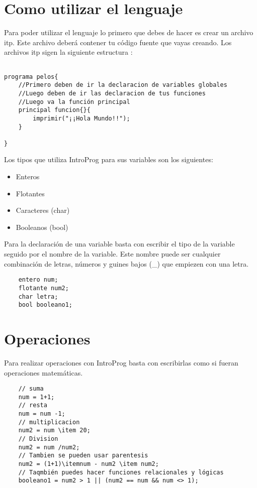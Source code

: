 \documentclass[
10pt, %
a4paper, %
oneside, %
headinclude,footinclude, %
BCOR5mm, %
]{scrartcl}
\begin{document}
\section{Como utilizar el lenguaje}

Para poder utilizar el lenguaje lo primero que debes de hacer es crear un archivo itp. Este archivo deberá contener tu código fuente que vayas creando.
Los archivos itp sigen la siguiente estructura :
\begin{lstlisting}

programa pelos{
    //Primero deben de ir la declaracion de variables globales
    //Luego deben de ir las declaracion de tus funciones
    //Luego va la función principal
    principal funcion{}{
        imprimir("¡¡Hola Mundo!!");
    }

}

\end{lstlisting}

Los tipos que utiliza IntroProg para sus variables son los siguientes:
\begin{itemize}
    \item Enteros
    \item Flotantes
    \item Caracteres (char)
    \item Booleanos (bool)
\end{itemize}

Para la declaración de una variable basta con escribir el tipo de la variable seguido por el nombre de la variable. Este nombre puede ser cualquier combinación de letras, números y guines bajos (\_) que empiezen con una letra.

\begin{lstlisting}
    entero num;
    flotante num2;
    char letra;
    bool booleano1;
\end{lstlisting}

\section{Operaciones}

Para realizar operaciones con IntroProg basta con escribirlas como si fueran operaciones matemáticas.
\begin{lstlisting}
    // suma
    num = 1+1;
    // resta
    num = num -1;
    // multiplicacion
    num2 = num \item 20;
    // Division
    num2 = num /num2;
    // Tambien se pueden usar parentesis
    num2 = (1+1)\itemnum - num2 \item num2;
    // Taqmbién puedes hacer funciones relacionales y lógicas
    booleano1 = num2 > 1 || (num2 == num && num <> 1); 
\end{lstlisting}
\end{document}

